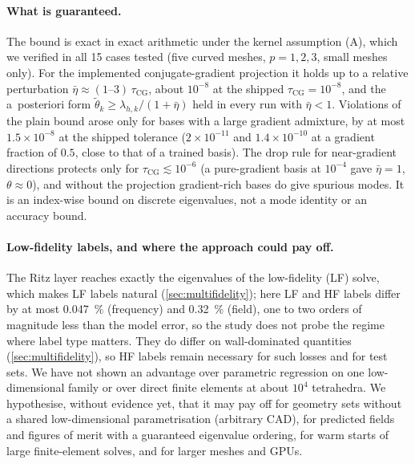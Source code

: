 \paragraph{What is guaranteed.}
The bound is exact in exact arithmetic under the kernel assumption (A), which we verified in all 15 cases tested (five curved meshes, $p=1,2,3$, small meshes only). %
For the implemented conjugate-gradient projection it holds up to a relative perturbation $\bar\eta\approx(1\text{--}3)\,\tau_{\mathrm{CG}}$, about $10^{-8}$ at the shipped $\tau_{\mathrm{CG}}=10^{-8}$, and the a~posteriori form $\tilde\theta_k\ge\lambda_{h,k}/(1+\bar\eta)$ held in every run with $\bar\eta<1$. %
Violations of the plain bound arose only for bases with a large gradient admixture, by at most $1.5\times10^{-8}$ at the shipped tolerance ($2\times10^{-11}$ and $1.4\times10^{-10}$ at a gradient fraction of $0.5$, close to that of a trained basis). %
The drop rule for near-gradient directions protects only for $\tau_{\mathrm{CG}}\lesssim10^{-6}$ (a pure-gradient basis at $10^{-4}$ gave $\bar\eta=1$, $\theta\approx0$), and without the projection gradient-rich bases do give spurious modes. %
It is an index-wise bound on discrete eigenvalues, not a mode identity or an accuracy bound.

\paragraph{Low-fidelity labels, and where the approach could pay off.}
The Ritz layer reaches exactly the eigenvalues of the low-fidelity (LF) solve, which makes LF labels natural (\cref{sec:multifidelity}); here LF and HF labels differ by at most \SI{0.047}{\percent} (frequency) and \SI{0.32}{\percent} (field), one to two orders of magnitude less than the model error, so the study does not probe the regime where label type matters. %
They do differ on wall-dominated quantities (\cref{sec:multifidelity}), so HF labels remain necessary for such losses and for test sets.
We have not shown an advantage over parametric regression on one low-dimensional family or over direct finite elements at about $10^4$ tetrahedra. We hypothesise, without evidence yet, that it may pay off for geometry sets without a shared low-dimensional parametrisation (arbitrary CAD), for predicted fields and figures of merit with a guaranteed eigenvalue ordering, for warm starts of large finite-element solves, and for larger meshes and GPUs.

